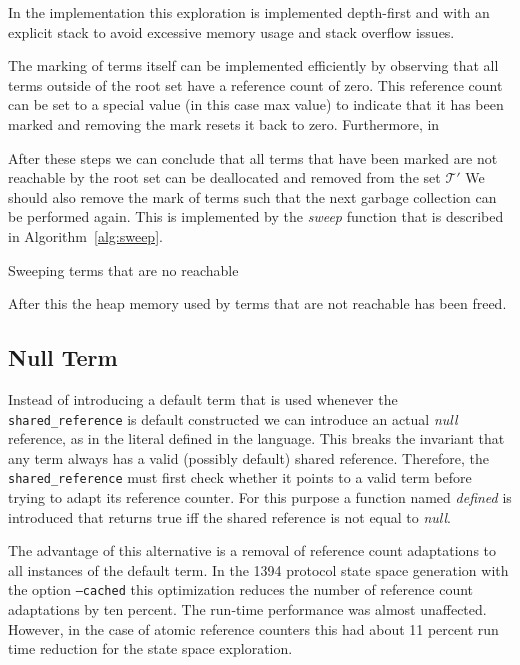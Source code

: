 \documentclass[10pt,a4paper]{article}
\theoremstyle{definition}
\newcommand{\terms}{\mathcal{T}}
\renewcommand{\gets}{:=}
\begin{document}
\noindent In the implementation this exploration is implemented depth-first and with an explicit stack to avoid excessive memory usage and stack overflow issues.

The marking of terms itself can be implemented efficiently by observing that all terms outside of the root set have a reference count of zero.
This reference count can be set to a special value (in this case max value) to indicate that it has been marked and removing the mark resets it back to zero.
Furthermore, in

After these steps we can conclude that all terms that have been marked are not reachable by the root set can be deallocated and removed from the set $\terms'$
We should also remove the mark of terms such that the next garbage collection can be performed again.
This is implemented by the \emph{sweep} function that is described in Algorithm~\ref{alg:sweep}.

\begin{algorithm}[H]
  \caption{Sweeping terms that are no reachable}\label{alg:sweep}
  \begin{algorithmic}[1]
        \State{$S \gets S \setminus \{t\}$}
      \Else
      \EndIf
    \EndFor
    \EndProcedure
  \end{algorithmic}
\end{algorithm}

\noindent After this the heap memory used by terms that are not reachable has been freed.

\subsection{Null Term}

Instead of introducing a default term that is used whenever the \texttt{shared\_reference} is default constructed we can introduce an actual \emph{null} reference, as in the literal defined in the language.
This breaks the invariant that any term always has a valid (possibly default) shared reference.
Therefore, the \texttt{shared\_reference} must first check whether it points to a valid term before trying to adapt its reference counter.
For this purpose a function named \emph{defined} is introduced that returns true iff the shared reference is not equal to \emph{null}.

The advantage of this alternative is a removal of reference count adaptations to all instances of the default term.
In the 1394 protocol state space generation with the option \texttt{--cached} this optimization reduces the number of reference count adaptations by ten percent. The run-time performance was almost unaffected. However, in the case of atomic reference counters this had about 11 percent run time reduction for the state space exploration.
\end{document}
